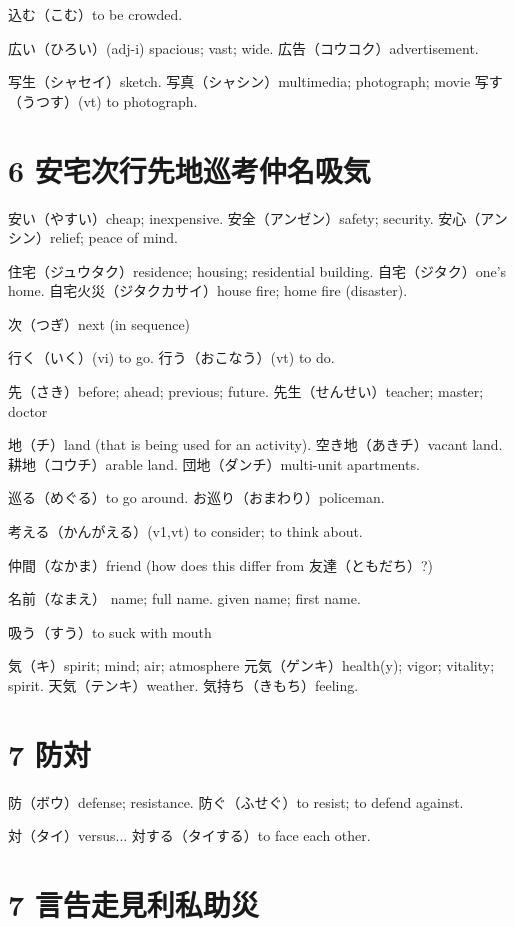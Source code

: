 込む（こむ）to be crowded.

広い（ひろい）(adj-i) spacious; vast; wide.
広告（コウコク）advertisement.

写生（シャセイ）sketch.
写真（シャシン）multimedia; photograph; movie
写す（うつす）(vt) to photograph.

\section{6 安宅次行先地巡考仲名吸気}

安い（やすい）cheap; inexpensive.
安全（アンゼン）safety; security.
安心（アンシン）relief; peace of mind.

住宅（ジュウタク）residence; housing; residential building.
自宅（ジタク）one's home.
自宅火災（ジタクカサイ）house fire; home fire (disaster).

次（つぎ）next (in sequence)

行く（いく）(vi) to go.
行う（おこなう）(vt) to do.

先（さき）before; ahead; previous; future.
先生（せんせい）teacher; master; doctor

地（チ）land (that is being used for an activity).
空き地（あきチ）vacant land.
耕地（コウチ）arable land.
団地（ダンチ）multi-unit apartments.

巡る（めぐる）to go around.
お巡り（おまわり）policeman.

考える（かんがえる）(v1,vt) to consider; to think about.

仲間（なかま）friend (how does this differ from 友達（ともだち）?)

名前（なまえ）
name; full name.
given name; first name.

吸う（すう）to suck with mouth

気（キ）spirit; mind; air; atmosphere
元気（ゲンキ）health(y); vigor; vitality; spirit.
天気（テンキ）weather.
気持ち（きもち）feeling.

\section{7 防対}

防（ボウ）defense; resistance.
防ぐ（ふせぐ）to resist; to defend against.

対（タイ）versus...
対する（タイする）to face each other.

\section{7 言告走見利私助災}

